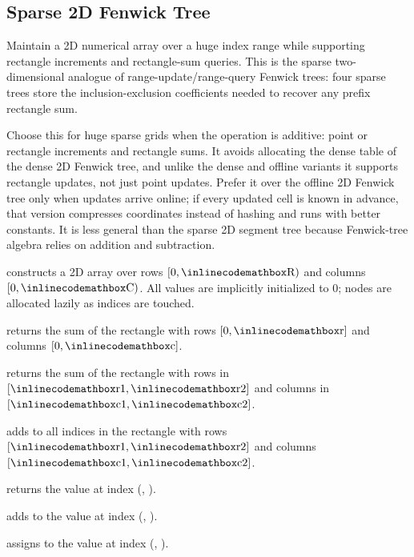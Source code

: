 \subsection{Sparse 2D Fenwick Tree}
\label{sec:2.7.6}
Maintain a 2D numerical array over a huge index range while supporting rectangle increments and rectangle-sum queries. This is the sparse two-dimensional analogue of range-update/range-query Fenwick trees: four sparse trees store the inclusion-exclusion coefficients needed to recover any prefix rectangle sum.

Choose this for huge sparse grids when the operation is additive: point or rectangle increments and rectangle sums. It avoids allocating the dense  table of the dense 2D Fenwick tree, and unlike the dense and offline variants it supports rectangle updates, not just point updates. Prefer it over the offline 2D Fenwick tree only when updates arrive online; if every updated cell is known in advance, that version compresses coordinates instead of hashing and runs with better constants. It is less general than the sparse 2D segment tree because Fenwick-tree algebra relies on addition and subtraction.

\begin{compactitem}
  \item {} constructs a 2D array over rows $[0, {\inlinecodemath{R}})$ and columns $[0, {\inlinecodemath{C}})$. All values are implicitly initialized to $0$; nodes are allocated lazily as indices are touched.
  \item {} returns the sum of the rectangle with rows $[0, {\inlinecodemath{r}}]$ and columns $[0, {\inlinecodemath{c}}]$.
  \item {} returns the sum of the rectangle with rows in $[{\inlinecodemath{r1}}, {\inlinecodemath{r2}}]$ and columns in $[{\inlinecodemath{c1}}, {\inlinecodemath{c2}}]$.
  \item {} adds  to all indices in the rectangle with rows $[{\inlinecodemath{r1}}, {\inlinecodemath{r2}}]$ and columns $[{\inlinecodemath{c1}}, {\inlinecodemath{c2}}]$.
  \item {} returns the value at index (, ).
  \item {} adds  to the value at index (, ).
  \item {} assigns  to the value at index (, ).
\end{compactitem}


